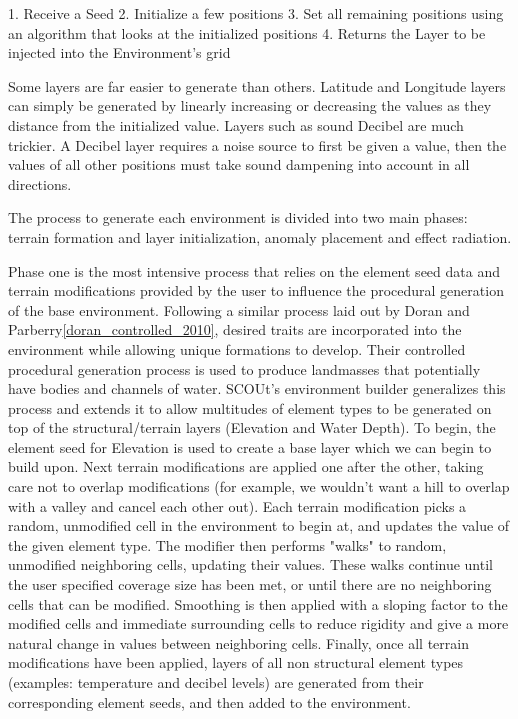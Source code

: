 1.	Receive a Seed
2.	Initialize a few positions
3.	Set all remaining positions using an algorithm that looks at the initialized positions
4.	Returns the Layer to be injected into the Environment’s grid

Some layers are far easier to generate than others.
Latitude and Longitude layers can simply be generated by linearly increasing or decreasing the values as they distance from the initialized value.
Layers such as sound Decibel are much trickier.
A Decibel layer requires a noise source to first be given a value, then the values of all other positions must take sound dampening into account in all directions.


The process to generate each environment is divided into two main phases: terrain formation and layer initialization, anomaly placement and effect radiation.

Phase one is the most intensive process that relies on the element seed data and terrain modifications provided by the user to influence the procedural generation of the base environment.
Following a similar process laid out by Doran and Parberry\ref{doran_controlled_2010}, desired traits are incorporated into the environment while allowing unique formations to develop.
Their controlled procedural generation process is used to produce landmasses that potentially have bodies and channels of water.
SCOUt's environment builder generalizes this process and extends it to allow multitudes of element types to be generated on top of the structural/terrain layers (Elevation and Water Depth).
To begin, the element seed for Elevation is used to create a base layer which we can begin to build upon.
Next terrain modifications are applied one after the other, taking care not to overlap modifications (for example, we wouldn't want a hill to overlap with a valley and cancel each other out).
Each terrain modification picks a random, unmodified cell in the environment to begin at, and updates the value of the given element type.
The modifier then performs "walks" to random, unmodified neighboring cells, updating their values.
These walks continue until the user specified coverage size has been met, or until there are no neighboring cells that can be modified.
Smoothing is then applied with a sloping factor to the modified cells and immediate surrounding cells to reduce rigidity and give a more natural change in values between neighboring cells.
Finally, once all terrain modifications have been applied, layers of all non structural element types (examples: temperature and decibel levels) are generated from their corresponding element seeds, and then added to the environment.


